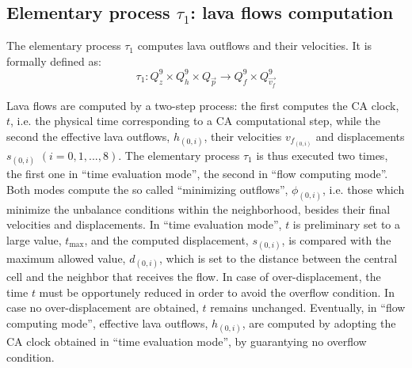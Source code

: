 \subsection{Elementary process \(\tau_1\): lava flows computation}
The elementary process $\tau_1$ computes lava outflows and their velocities. It is formally defined as:
$$
\tau_1: Q_z^9 \times Q_h^9 \times Q_{\overrightarrow{p}} \to Q_f^9 \times Q_{\overrightarrow{v_f}}^9
$$

Lava flows are computed by a two-step process: the first computes the CA clock,
$t$, i.e. the physical time corresponding to a CA computational step, while the
second the effective lava outflows, $h_{(0,i)}$, their velocities
$v_{f_{(0,i)}}$ and displacements $s_{(0,i)}$ $(i=0,1,...,8)$. The elementary
process $\tau_1$ is thus executed two times, the first one in ``time evaluation
mode'', the second in ``flow computing mode''. Both modes compute the so called
``minimizing outflows'', $\phi_{(0,i)}$, i.e. those which minimize the unbalance
conditions within the neighborhood, besides their final velocities and
displacements. In ``time evaluation mode'', $t$ is preliminary set to a large
value, $t_{\max}$, and the computed displacement, $s_{(0,i)}$, is compared with
the maximum allowed value, $d_{(0,i)}$, which is set to the distance between the
central cell and the neighbor that receives the flow. In case of
over-displacement, the time $t$ must be opportunely reduced in order to avoid
the overflow condition. In case no over-displacement are obtained, $t$ remains
unchanged. Eventually, in ``flow computing mode'', effective lava outflows,
$h_{(0,i)}$, are computed by adopting the CA clock obtained in ``time evaluation
mode'', by guarantying no overflow condition.

